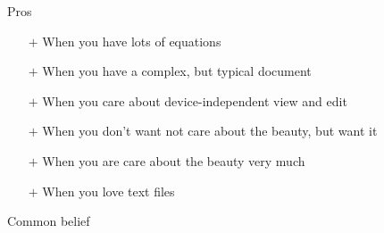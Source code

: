 \begin{frame}{Pros}\relax
     \begin{itemize}
        \item[$+$] When you have lots of {\csk equations} %
        \item[$+$] When you have a {\csk complex, but typical} document %
        \item[$+$] When you care about {\csk device-independent} view and edit %
        \item[$+$] When you don't want {\csk not care about the beauty}, but want it%
        \item[$+$] When you are {\csk care about the beauty} very much%
        \item[$+$] When you {\csk love text files} 
    \end{itemize}
\end{frame}


\begin{frame}[fragile]{Common belief}\relax
    \begin{center}
         
    \end{center}
\end{frame}

